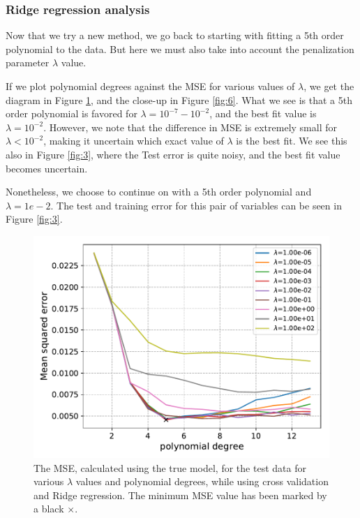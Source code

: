 \documentclass[a4paper,10pt,english]{article}
\begin{document}
\subsubsection{Ridge regression analysis}
Now that we try a new method, we go back to starting with fitting a 5th order polynomial to the data. But here we must also take into account the penalization parameter $\lambda$ value. 

If we plot polynomial degrees against the MSE for various values of $\lambda$, we get the diagram in Figure \ref{fig:5}, and the close-up in Figure \ref{fig:6}. What we see is that a 5th order polynomial is favored for $\lambda=10^{-7} - 10^{-2}$, and the best fit value is $\lambda=10^{-2}$. However, we note that the difference in MSE is extremely small for $\lambda<10^{-2}$, making it uncertain which exact value of $\lambda$ is the best fit. We see this also in Figure \ref{fig:3}, where the Test error is quite noisy, and the best fit value becomes uncertain.

Nonetheless, we choose to continue on with a 5th order polynomial and $\lambda=1e-2$. The test and training error for this pair of variables can be seen in Figure \ref{fig:3}.

\begin{figure}[H]
	\centering
	\includegraphics[scale=0.6]{d_Ridge_MSE_pdegree_lmbda.pdf}
	\caption{The MSE, calculated using the true model, for the test data for various $\lambda$ values and polynomial degrees, while using cross validation and Ridge regression. The minimum MSE value has been marked by a black $\times$.}
	\label{fig:5}
\end{figure}
\end{document}
